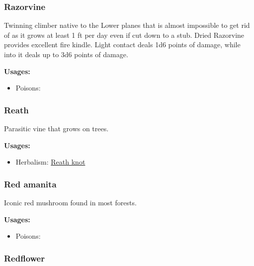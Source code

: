 \subsubsection{Razorvine}
\label{Razorvine}

Twinning climber native to the Lower planes that is almost impossible to get rid of as it grows at least 1 ft per day even if cut down to a stub. Dried Razorvine provides excellent fire kindle. Light contact deals 1d6 points of damage, while into it deals up to 3d6 points of damage.

\vspace{5mm}

\textbf{Usages:}

\begin{itemize}[noitemsep]
\item[] Poisons: \poison
\end{itemize}

\subsubsection{Reath}
\label{Reath}

Parasitic vine that grows on trees.

\vspace{5mm}

\textbf{Usages:}

\begin{itemize}[noitemsep]
\item[] Herbalism: \hyperref[Reath knot]{Reath knot}
\end{itemize}

\subsubsection{Red amanita}
\label{Red amanita}

Iconic red mushroom found in most forests.

\vspace{5mm}

\textbf{Usages:}

\begin{itemize}[noitemsep]
\item[] Poisons: \poison
\end{itemize}

\subsubsection{Redflower}
\label{Redflower}

